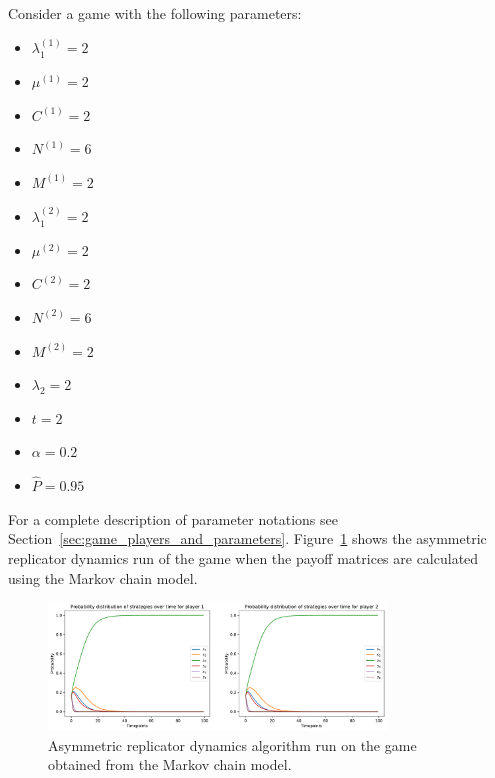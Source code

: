 Consider a game with the following parameters:

\begin{multicols}{3}
    \begin{itemize}
        \item \( \lambda_1^{(1)} = 2 \)
        \item \( \mu^{(1)} = 2 \)
        \item \( C^{(1)} = 2 \)
        \item \( N^{(1)} = 6 \)
        \item \( M^{(1)} = 2 \)

        \columnbreak
        \item \( \lambda_1^{(2)} = 2 \)
        \item \( \mu^{(2)} = 2 \)
        \item \( C^{(2)} = 2 \)
        \item \( N^{(2)} = 6 \)
        \item \( M^{(2)} = 2 \)

        \columnbreak
        \item \( \lambda_2 = 2 \)
        \item \( t = 2 \)
        \item \( \alpha = 0.2 \)
        \item \( \hat{P} = 0.95 \)
    \end{itemize}    
\end{multicols}

For a complete description of parameter notations see
Section~\ref{sec:game_players_and_parameters}.
Figure~\ref{fig:game_des_markov_baseline} shows the asymmetric replicator
dynamics run of the game when the payoff matrices are calculated using the
Markov chain model.

\begin{figure}[ht]
    \centering
    \includegraphics[width=0.8\textwidth]{chapters/06_agent_based_extension/Bin/game_model_with_des/game_markov_baseline.pdf}
    \caption{Asymmetric replicator dynamics algorithm run on the game obtained
    from the Markov chain model.}
    \label{fig:game_des_markov_baseline}
\end{figure}

